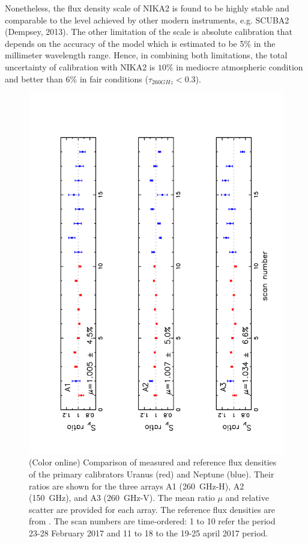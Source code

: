 \documentclass[]{aa} %
\begin{document}
Nonetheless, the flux density scale of NIKA2 is found to be highly stable and comparable to the level achieved
by other modern instruments, e.g. SCUBA2 (Dempsey, 2013). The other limitation of the scale is absolute calibration that depends on the accuracy of the \cite{moreno2010} model which is estimated to be 5\% in the millimeter wavelength range. Hence, in combining both limitations, the total uncertainty of calibration with NIKA2 is $10\%$ in mediocre atmospheric condition and better than $6\%$ in fair conditions ($\tau_{260 GHz} <0.3$). 

\begin{figure}[h]
   \centering
    \includegraphics[angle=270,width=1.10\linewidth]{Ura_Nept_r9_10.pdf}     
    \caption{(Color online) Comparison of  measured and reference flux densities of the primary calibrators Uranus (red) and Neptune (blue). Their ratios are shown for the three arrays A1 (260~GHz-H), A2 (150~GHz), and A3 (260~GHz-V). The mean ratio $\mu$ and relative scatter are provided for each array. The reference flux densities are from \cite{moreno2010}. The scan numbers are time-ordered: 1 to 10 refer the period 23-28 February 2017 and 11 to 18 to the 19-25 april 2017 period.}
         \label{fig:calibaccuracy}
\end{figure}
\end{document}

